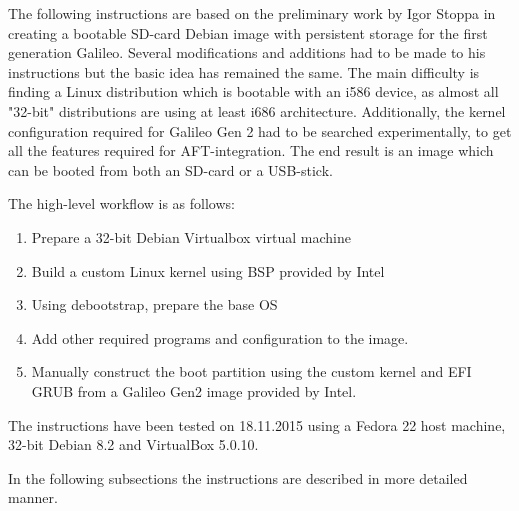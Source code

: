 \documentclass[a4paper,11pt]{article}
\begin{document}
The following instructions are based on the preliminary work by Igor Stoppa in creating a bootable SD-card Debian image with persistent storage for the first generation Galileo. Several modifications and additions had to be made to his instructions but the basic idea has remained the same. The main difficulty is finding a Linux distribution which is bootable with an i586 device, as almost all "32-bit" distributions are using at least i686 architecture. Additionally, the kernel configuration required for Galileo Gen 2 had to be searched experimentally, to get all the features required for AFT-integration. The end result is an image which can be booted from both an SD-card or a USB-stick.

The high-level workflow is as follows:
\begin{enumerate}
\label{galileodebianhighlevel}
\item Prepare a 32-bit Debian Virtualbox virtual machine
\item Build a custom Linux kernel using BSP provided by Intel
\item Using debootstrap, prepare the base OS
\item Add other required programs and configuration to the image.
\item Manually construct the boot partition using the custom kernel and EFI GRUB from a Galileo Gen2 image provided by Intel.
\end{enumerate}

The instructions have been tested on 18.11.2015 using a Fedora 22 host machine, 32-bit Debian 8.2 and VirtualBox 5.0.10.

In the following subsections the instructions are described in more detailed manner.
\end{document}
